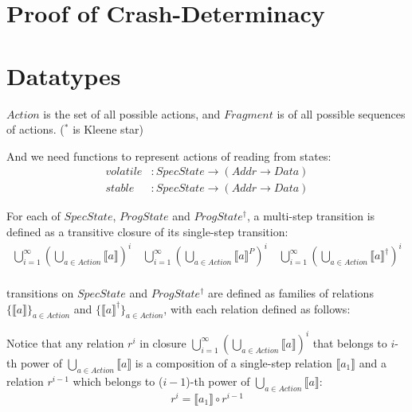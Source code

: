 \documentclass[letterpaper,twocolumn,10pt]{article}
\theoremstyle{definition}
\renewcommand{\i}[1]{\ensuremath{\mathit{#1}}}
\begin{document}
\section{Proof of Crash-Determinacy}
\label{sec:proof}

\section{Datatypes}


$Action$ is the set of all possible actions, and $\i{Fragment}$ is of all possible sequences of actions. ($^*$ is Kleene star)

And we need functions to represent actions of reading from states:
\begin{align*}
	volatile &: \i{SpecState} \to (\i{Addr} \to \i{Data})\\
	stable &: \i{SpecState} \to (\i{Addr} \to \i{Data})
\end{align*}

For each of $\i{SpecState}$, $\i{ProgState}$ and $\i{ProgState^\dagger}$, a multi-step transition is defined as a transitive closure of its single-step transition:
\begin{align*}
	\bigcup_{i=1}^\infty\left(\bigcup_{a \in Action} \llbracket a \rrbracket \right)^i \quad
	\bigcup_{i=1}^\infty\left(\bigcup_{a \in Action} \llbracket a \rrbracket^P \right)^i \quad
	\bigcup_{i=1}^\infty\left(\bigcup_{a \in Action} \llbracket a \rrbracket^\dagger \right)^i \\
\end{align*}


transitions on $\i{SpecState}$ and $\i{ProgState^\dagger}$ are defined as families of relations $\{ \llbracket a \rrbracket \}_\i{a \in Action}$ and $\{ \llbracket a \rrbracket^\dagger \}_\i{a \in Action}$, with each relation defined as follows:

Notice that any relation $r^i$ in closure $\bigcup_{i=1}^\infty\left(\bigcup_{a \in Action} \llbracket a \rrbracket \right)^i$ that belongs to $i$-th power of $\bigcup_{a \in Action} \llbracket a \rrbracket$ is a composition of a single-step relation $\llbracket a_1 \rrbracket$ and a relation $r^{i-1}$ which belongs to (${i-1}$)-th power of $\bigcup_{a \in Action} \llbracket a \rrbracket$:
$$r^i = \llbracket a_1 \rrbracket \circ r^{i-1}$$
\end{document}
